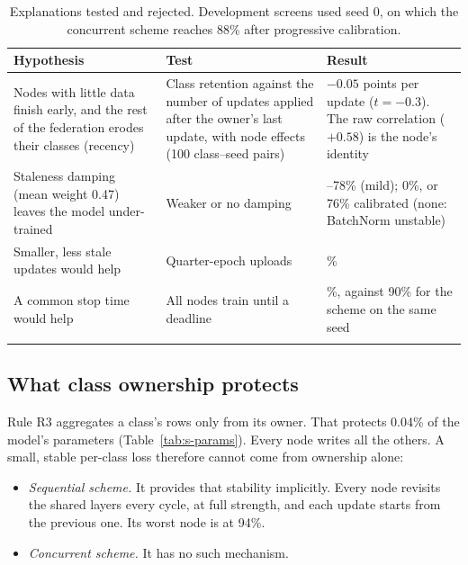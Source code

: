 \documentclass[pdflatex,sn-mathphys-num]{sn-jnl}
\begin{document}
\begin{table}[h]
\caption{Explanations tested and rejected. Development screens used seed 0, on which the concurrent scheme reaches 88\% after progressive calibration.}\label{tab:s-hypotheses}
\footnotesize
\begin{tabular*}{\textwidth}{@{\extracolsep\fill}>{\raggedright\arraybackslash}p{}>{\raggedright\arraybackslash}p{}>{\raggedright\arraybackslash}p{}}
\toprule
Hypothesis & Test & Result \\
\midrule
Nodes with little data finish early, and the rest of the federation erodes their classes (recency) & Class retention against the number of updates applied after the owner's last update, with node effects (100 class--seed pairs) & $-0.05$ points per update ($t=-0.3$). The raw correlation ($+0.58$) is the node's identity \\
Staleness damping (mean weight 0.47) leaves the model under-trained & Weaker or no damping & 77--78\% (mild); 0\%, or 76\% calibrated (none: BatchNorm unstable) \\
Smaller, less stale updates would help & Quarter-epoch uploads & 82\% \\
A common stop time would help & All nodes train until a deadline & 85\%, against 90\% for the scheme on the same seed \\
\botrule
\end{tabular*}
\end{table}

\subsection{What class ownership protects}
Rule R3 aggregates a class's rows only from its owner. That protects 0.04\% of the model's parameters (Table~\ref{tab:s-params}). Every node writes all the others. A small, stable per-class loss therefore cannot come from ownership alone:
\begin{itemize}
\item \emph{Sequential scheme.} It provides that stability implicitly. Every node revisits the shared layers every cycle, at full strength, and each update starts from the previous one. Its worst node is at 94\%.
\item \emph{Concurrent scheme.} It has no such mechanism.
\end{itemize}
\end{document}
